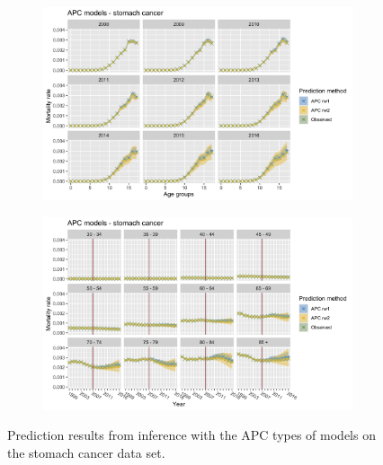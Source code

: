 \begin{figure}[h!]
    \centering
    \begin{subfigure}[b]{.45\linewidth}
        \includegraphics[width=\linewidth]{real-data/real-data-univariate/Figures/univariate-APC-by-age-stomach.png}
    \end{subfigure}
    \begin{subfigure}[b]{.45\linewidth}
        \includegraphics[width=\linewidth]{real-data/real-data-univariate/Figures/univariate-APC-by-period-stomach.png}
    \end{subfigure}
    \caption{Prediction results from inference with the APC types of models on the stomach cancer data set.}
    \label{fig:uv-APC-stomach}
\end{figure}

